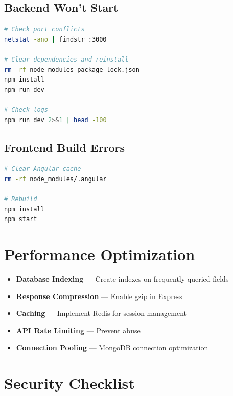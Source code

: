 \documentclass[11pt,a4paper,oneside,openany]{book}
\begin{document}
\subsection{Backend Won't Start}

\begin{lstlisting}[language=bash,caption=Debugging Backend Issues]
# Check port conflicts
netstat -ano | findstr :3000

# Clear dependencies and reinstall
rm -rf node_modules package-lock.json
npm install
npm run dev

# Check logs
npm run dev 2>&1 | head -100
\end{lstlisting}

\subsection{Frontend Build Errors}

\begin{lstlisting}[language=bash,caption=Fixing Angular Build Issues]
# Clear Angular cache
rm -rf node_modules/.angular

# Rebuild
npm install
npm start
\end{lstlisting}

\section{Performance Optimization}

\begin{itemize}
    \item \textbf{Database Indexing} --- Create indexes on frequently queried fields
    \item \textbf{Response Compression} --- Enable gzip in Express
    \item \textbf{Caching} --- Implement Redis for session management
    \item \textbf{API Rate Limiting} --- Prevent abuse
    \item \textbf{Connection Pooling} --- MongoDB connection optimization
\end{itemize}

\section{Security Checklist}
\end{document}
